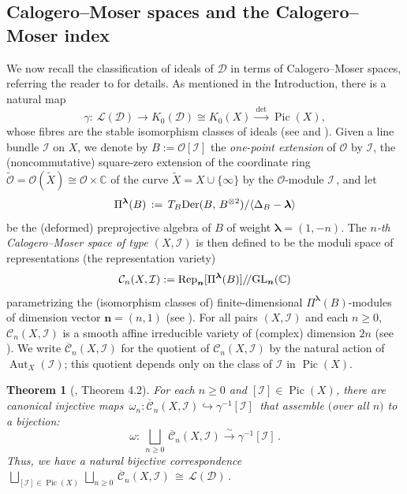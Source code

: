 \documentclass[11pt,reqno]{amsart}
\theoremstyle{plain}
\newtheorem{theorem}{Theorem}[section]
\theoremstyle{definition}
\theoremstyle{remark}
\numberwithin{equation}{section}
\newcommand{\cD}{\mathcal{D}}
\newcommand{\cO}{\mathcal{O}}
\newcommand{\cC}{\mathcal{C}}
\newcommand{\cL}{\mathcal{L}}
\newcommand{\C}{\mathbb{C}}
\DeclareMathOperator{\Pic}{Pic}
\DeclareMathOperator{\Aut}{Aut}
\begin{document}
\subsection{Calogero--Moser spaces and the Calogero--Moser index}
\label{S2.5}
We now recall the classification of ideals of $\cD$ in terms of Calogero--Moser spaces, referring
the reader to \cite{BerestChalykhIdeals} for details. As mentioned in the Introduction, there is a
natural map
\begin{equation}
\label{E28}
  \gamma : \ \cL(\cD) \to K_0(\cD) \cong K_0(X) \xrightarrow{\ \det\ } \Pic(X) ,
\end{equation}
whose fibres are the stable isomorphism classes of ideals (see \cite{BerestWilson09} and
\cite[Section~3.2]{BerestChalykhIdeals}). Given a line bundle $\mathcal{I}$ on $X$, we denote by
$ B := \cO[\mathcal{I}]$ the {\it one-point extension} of $ \cO $ by $\mathcal{I}$, the (noncommutative) square-zero extension of the coordinate ring $\tilde{\cO} = \cO(\tilde X) \cong \cO \times \C $ of the curve $ \tilde{X} = X \cup \{\infty\} $ by the $\cO$-module $\mathcal{I}\,$, and let
%
$$
\Pi^{\boldsymbol{\lambda}}(B)\,:=\, T_B {\rm Der}(B,\,B^{\otimes 2})/\langle \Delta_B - \boldsymbol{\lambda}\rangle
$$
be the (deformed) preprojective algebra of $B$ of weight
$\boldsymbol{\lambda} = (1, -n)$. The \emph{$n$-th Calogero--Moser space of type
$(X, \mathcal{I})$} is then defined to be the moduli space of representations
(the representation variety)
%
$$
\cC_n(X, \mathcal{I}) := {\rm Rep}_{\boldsymbol{n}}[\Pi^{\boldsymbol{\lambda}}(B)]/\!/{\rm GL}_{\boldsymbol{n}}(\C)
$$
%
parametrizing the (isomorphism classes of) finite-dimensional $\Pi^{\boldsymbol{\lambda}}(B)$-modules of dimension vector $\boldsymbol{n} = (n,1)$ (see \cite[Section~3.3]{BerestChalykhIdeals}). 
For all pairs $ (X, \mathcal{I}) $ and each $ n\ge 0 $, $\cC_n(X, \mathcal{I})$ is a smooth affine irreducible variety of (complex) dimension $2n$ (see \cite[Theorem 1.1]{BerestChalykhIdeals}).
We write $\overline{\cC}_n(X, \mathcal{I})$ for the
quotient of $\cC_n(X, \mathcal{I})$ by the natural action of $\Aut_X(\mathcal{I})$; this quotient
depends only on the class of $\mathcal{I}$ in $\Pic(X)$. 
%
\begin{theorem}[\cite{BerestChalykhIdeals}, Theorem 4.2]
\label{T2.2}
For each $n \ge 0$ and $[\mathcal{I}] \in \Pic(X)$, there are canonical injective maps
$\,\omega_n : \overline{\cC}_n(X, \mathcal{I}) \hookrightarrow \gamma^{-1}[\mathcal{I}]\,$ that assemble $($over all $n$$)$ to a bijection:
\[
  \omega : \ \bigsqcup_{n \ge 0}\, \overline{\cC}_n(X, \mathcal{I})
  \stackrel{\sim}{\longrightarrow} \gamma^{-1}[\mathcal{I}] \,.
\]
%
Thus, we have a natural bijective correspondence $ \,\bigsqcup_{[{\mathcal I}]\in \Pic(X)}\,\bigsqcup_{n \ge 0}\, \overline{\cC}_n(X, \mathcal{I})\,\cong\,\cL(\cD)\,$.
\end{theorem}
\end{document}
